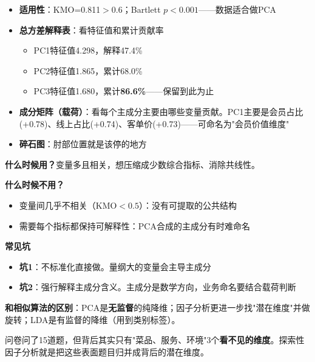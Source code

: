 \begin{algoresult}
\begin{itemize}
    \item \textbf{适用性}：KMO=0.811$>0.6$；Bartlett $p<0.001$——数据适合做PCA
    \item \textbf{总方差解释表}：看特征值和累计贡献率
    \begin{itemize}
        \item PC1特征值4.298，解释47.4\%
        \item PC2特征值1.865，累计68.0\%
        \item PC3特征值1.680，累计\textbf{86.6\%}——保留到此为止
    \end{itemize}
    \item \textbf{成分矩阵（载荷）}：看每个主成分主要由哪些变量贡献。PC1主要是会员占比(+0.78)、线上占比(+0.74)、客单价(+0.73)——可命名为"会员价值维度"
    \item \textbf{碎石图}：肘部位置就是该停的地方
\end{itemize}
\end{algoresult}

\begin{algonotes}
\textbf{什么时候用？}变量多且相关，想压缩成少数综合指标、消除共线性。

\textbf{什么时候不用？}
\begin{itemize}
    \item 变量间几乎不相关（KMO$<0.5$）：没有可提取的公共结构
    \item 需要每个指标都保持可解释性：PCA合成的主成分有时难命名
\end{itemize}

\textbf{常见坑}
\begin{itemize}
    \item \textbf{坑1}：不标准化直接做。量纲大的变量会主导主成分
    \item \textbf{坑2}：强行解释主成分含义。主成分是数学方向，业务命名要结合载荷判断
\end{itemize}

\textbf{和相似算法的区别}：PCA是\textbf{无监督}的纯降维；因子分析更进一步找"潜在维度"并做旋转；LDA是有监督的降维（用到类别标签）。
\end{algonotes}


\begin{algointro}
问卷问了15道题，但背后其实只有"菜品、服务、环境"3个\textbf{看不见的维度}。探索性因子分析就是把这些表面题目归并成背后的潜在维度。
\end{algointro}

